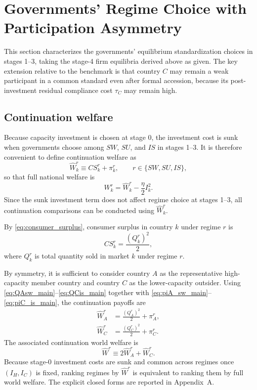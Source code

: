 \section{Governments' Regime Choice with Participation Asymmetry}

This section characterizes the governments' equilibrium standardization choices in stages 1--3, taking the stage-4 firm equilibria derived above as given. The key extension relative to the benchmark is that country $C$ may remain a weak participant in a common standard even after formal accession, because its post-investment residual compliance cost $\tau_C$ may remain high.

\subsection{Continuation welfare}

Because capacity investment is chosen at stage 0, the investment cost is sunk when governments choose among $SW$, $SU$, and $IS$ in stages 1--3. It is therefore convenient to define continuation welfare as
\begin{equation}
\widehat W_k^r \equiv CS_k^r + \pi_k^r,
\qquad r\in\{SW,SU,IS\},
\label{eq:cont_welfare_main}
\end{equation}
so that full national welfare is
\[
W_k^r=\widehat W_k^r-\frac{\eta}{2}I_k^2.
\]
Since the sunk investment term does not affect regime choice at stages 1--3, all continuation comparisons can be conducted using $\widehat W_k^r$.

By \eqref{eq:consumer_surplus}, consumer surplus in country $k$ under regime $r$ is
\begin{equation}
CS_k^r=\frac{(Q_k^r)^2}{2},
\label{eq:cs_main}
\end{equation}
where $Q_k^r$ is total quantity sold in market $k$ under regime $r$.

By symmetry, it is sufficient to consider country $A$ as the representative high-capacity member country and country $C$ as the lower-capacity outsider. Using \eqref{eq:QAsw_main}--\eqref{eq:QCis_main} together with \eqref{eq:piA_sw_main}--\eqref{eq:piC_is_main}, the continuation payoffs are
\begin{align}
\widehat W_A^r &= \frac{(Q_A^r)^2}{2}+\pi_A^r, \label{eq:WA_r_main}\\
\widehat W_C^r &= \frac{(Q_C^r)^2}{2}+\pi_C^r. \label{eq:WC_r_main}
\end{align}
The associated continuation world welfare is
\begin{equation}
\widehat W^r \equiv 2\widehat W_A^r+\widehat W_C^r.
\label{eq:world_continuation}
\end{equation}
Because stage-0 investment costs are sunk and common across regimes once
$(I_H,I_C)$ is fixed, ranking regimes by $\widehat W^r$ is equivalent to
ranking them by full world welfare. The explicit closed forms are reported in
Appendix~A.

